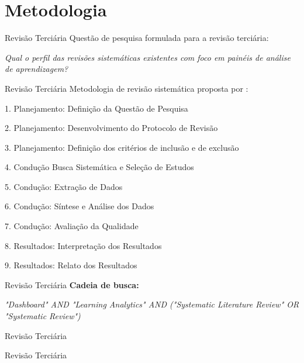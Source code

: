 \section{Metodologia}

\begin{frame}{Revisão Terciária}
    Questão de pesquisa formulada para a revisão terciária: 

    \emph{Qual o perfil das revisões sistemáticas existentes com foco em painéis de análise de aprendizagem?}
\end{frame}

\begin{frame}{Revisão Terciária}
  Metodologia de revisão sistemática proposta por \cite{Kitchenham:2007}:
  \begin{itemize}
    \begin{spacing}{0.3}
      \item 1. Planejamento: Definição da Questão de Pesquisa
      \item 2. Planejamento: Desenvolvimento do Protocolo de Revisão
      \item 3. Planejamento: Definição dos critérios de inclusão e de exclusão
      \item 4. Condução Busca Sistemática e Seleção de Estudos
      \item 5. Condução: Extração de Dados
      \item 6. Condução: Síntese e Análise dos Dados
      \item 7. Condução: Avaliação da Qualidade
      \item 8. Resultados: Interpretação dos Resultados
      \item 9. Resultados: Relato dos Resultados
    \end{spacing}
  \end{itemize}
\end{frame}

\begin{frame}{Revisão Terciária}
    \textbf{Cadeia de busca:}

    \textit{"Dashboard" AND "Learning Analytics" AND ("Systematic Literature Review" OR "Systematic Review")}
\end{frame}

\begin{frame}{Revisão Terciária}
    
\end{frame}


\begin{frame}{Revisão Terciária}
    {\tiny
    
    }
\end{frame}

